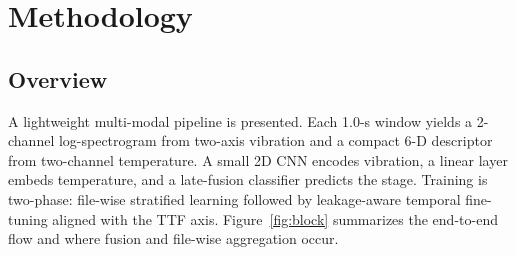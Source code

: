 \documentclass[pdflatex,sn-mathphys-num]{sn-jnl}%
\begin{document}
\section{Methodology}
\label{sec:method}

\subsection{Overview}
A lightweight multi-modal pipeline is presented. Each 1.0-s window yields a 2-channel log-spectrogram from two-axis vibration and a compact 6-D descriptor from two-channel temperature. A small 2D CNN encodes vibration, a linear layer embeds temperature, and a late-fusion classifier predicts the stage. Training is two-phase: file-wise stratified learning followed by leakage-aware temporal fine-tuning aligned with the TTF axis. Figure~\ref{fig:block} summarizes the end-to-end flow and where fusion and file-wise aggregation occur.
\end{document}
